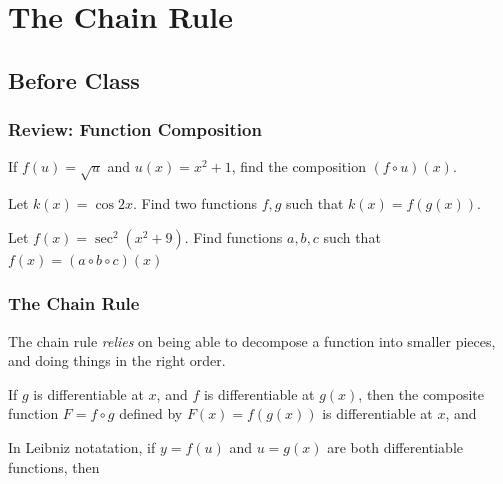 \documentclass[notes]{subfiles}
\begin{document}
	\fancyhead[LO,RE]{\bfseries \small \currentname}
	\fancyfoot[C]{{}}
	\fancyfoot[LO,RE]{\large \thepage}	%
	
\section*{The Chain Rule}\label{cs36}
	\subsection*{Before Class}
	\subsubsection*{Review: Function Composition}
		\begin{ex}
			If \(f(u)= \sqrt{u}\) and \(u(x) = x^2 + 1\), find the composition \((f\circ u)(x)\).
		\end{ex}
			
		\begin{ex}
			Let \(k(x) = \cos 2x\).  Find two functions \(f,g\) such that \(k(x) = f(g(x))\).
		\end{ex}
			
		\begin{ex}
			Let \(f(x) = \sec^2 (x^2 + 9)\).  Find functions \(a,b,c\) such that \(f(x) = (a\circ b\circ c)(x)\)
		\end{ex}
			\newpage
			
	\subsubsection*{The Chain Rule}
		The chain rule \emph{relies} on being able to decompose a function into smaller pieces, and doing things in the right order.  
		\begin{thm}
			If \(g\) is differentiable at \(x\), and \(f\) is differentiable at \(g(x)\), then the composite function \(F = f\circ g\) defined by \(F(x) = f(g(x))\) is differentiable at \(x\), and\\[25pt] \vspace*{45pt}
			
			In Leibniz notatation, if \(y = f(u)\) and \(u = g(x)\) are both differentiable functions, then\\ \[\]\vspace*{50pt}
			
		\end{thm}
\end{document}
